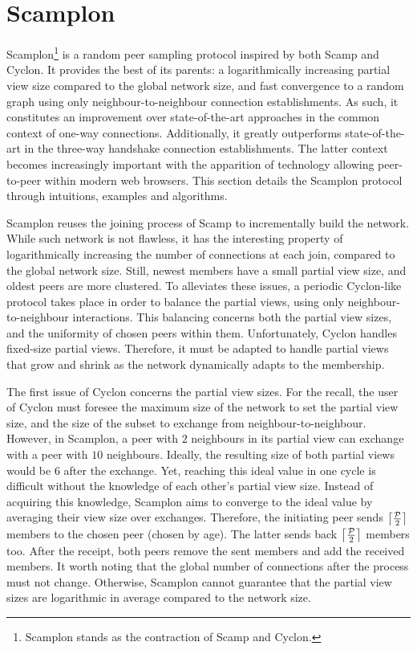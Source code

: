 
\section{Scamplon}
\label{sec:proposal}

Scamplon\footnote{Scamplon stands as the contraction of Scamp and Cyclon.} is a
random peer sampling protocol inspired by both Scamp and Cyclon. It provides
the best of its parents: a logarithmically increasing partial view size
compared to the global network size, and fast convergence to a random graph
using only neighbour-to-neighbour connection establishments. As such, it
constitutes an improvement over state-of-the-art approaches in the common
context of one-way connections. Additionally, it greatly outperforms
state-of-the-art in the three-way handshake connection establishments. The
latter context becomes increasingly important with the apparition of technology
allowing peer-to-peer within modern web browsers. This section details the
Scamplon protocol through intuitions, examples and algorithms.

\begin{asparadesc}
\item [Scamplon] reuses the joining process of Scamp to incrementally build the
network. While such network is not flawless, it has the interesting property of
logarithmically increasing the number of connections at each join, compared to
the global network size. Still, newest members have a small partial view size,
and oldest peers are more clustered. To alleviates these issues, a periodic
Cyclon-like protocol takes place in order to balance the partial views, using
only neighbour-to-neighbour interactions. This balancing concerns both the
partial view sizes, and the uniformity of chosen peers within
them. Unfortunately, Cyclon handles fixed-size partial views. Therefore, it
must be adapted to handle partial views that grow and shrink as the network
dynamically adapts to the membership.
\end{asparadesc}

The first issue of Cyclon concerns the partial view sizes. For the recall, the
user of Cyclon must foresee the maximum size of the network to set the partial
view size, and the size of the subset to exchange from neighbour-to-neighbour.
However, in Scamplon, a peer with $2$ neighbours in its partial view can
exchange with a peer with $10$ neighbours. Ideally, the resulting size of both
partial views would be $6$ after the exchange. Yet, reaching this ideal value
in one cycle is difficult without the knowledge of each other's partial view
size. Instead of acquiring this knowledge, Scamplon aims to converge to the
ideal value by averaging their view size over exchanges. Therefore, the
initiating peer sends $\left\lceil\mathcal{P}\over{2}\right\rceil$ members to
the chosen peer (chosen by age). The latter sends back
$\left\lceil\mathcal{P}\over{2}\right\rceil$ members too. After the receipt,
both peers remove the sent members and add the received members. It worth
noting that the global number of connections after the process must not
change. Otherwise, Scamplon cannot guarantee that the partial view sizes are
logarithmic in average compared to the network size.

